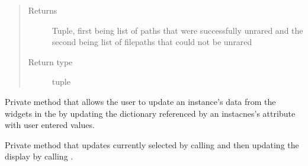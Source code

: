 \documentclass[letterpaper,10pt,english]{sphinxmanual}
\begin{document}
\begin{fulllineitems}
\begin{fulllineitems}
\begin{quote}
\begin{description}
\item[{Returns}] \leavevmode
Tuple, first being list of paths that were successfully unrared and the
second being list of filepaths that could not be unrared

\item[{Return type}] \leavevmode
tuple

\end{description}\end{quote}

\end{fulllineitems}


\begin{fulllineitems}
\label{\detokenize{polo.windows:polo.windows.run_importer.RunImporterDialog._update_candidate_run_data}}
Private method that allows the user to update an {\hyperref[\detokenize{polo.windows:polo.windows.run_importer.ImportCandidate}]{}}
instance’s data from the widgets in the  by updating
the dictionary referenced by an {\hyperref[\detokenize{polo.windows:polo.windows.run_importer.ImportCandidate}]{}} instacnes’s 
 attribute with user entered values.

\end{fulllineitems}


\begin{fulllineitems}
\label{\detokenize{polo.windows:polo.windows.run_importer.RunImporterDialog._update_selected_candidate}}
Private method that updates currently selected {\hyperref[\detokenize{polo.windows:polo.windows.run_importer.ImportCandidate}]{}} by
calling {\hyperref[\detokenize{polo.windows:polo.windows.run_importer.RunImporterDialog._update_candidate_run_data}]{}}
and then updating the display by calling
{\hyperref[\detokenize{polo.windows:polo.windows.run_importer.RunImporterDialog._populate_fields}]{}}.


\end{fulllineitems}
\end{fulllineitems}
\end{document}
